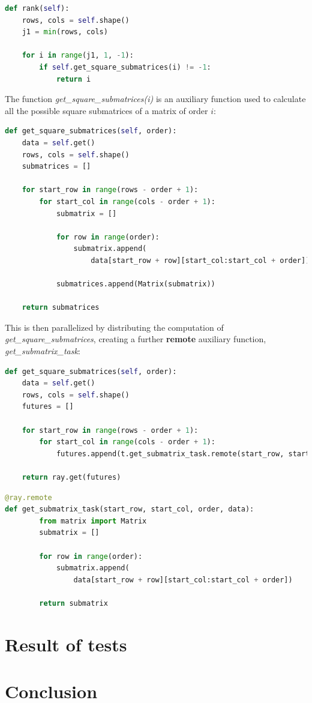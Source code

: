 \begin{lstlisting}[language=Python, caption={Rank function}]
def rank(self):
    rows, cols = self.shape()
    j1 = min(rows, cols)

    for i in range(j1, 1, -1):
        if self.get_square_submatrices(i) != -1:
            return i    
\end{lstlisting}
The function \textit{get\_square\_submatrices(i)} is an auxiliary function used to calculate all the possible square submatrices of a matrix of order $i$:
\begin{lstlisting}[language=Python, caption={get\_square\_submatrices}]
def get_square_submatrices(self, order):
    data = self.get()
    rows, cols = self.shape()
    submatrices = []

    for start_row in range(rows - order + 1):
        for start_col in range(cols - order + 1):
            submatrix = []

            for row in range(order):
                submatrix.append(
                    data[start_row + row][start_col:start_col + order])

            submatrices.append(Matrix(submatrix))

    return submatrices
\end{lstlisting}
This is then parallelized by distributing the computation of \textit{get\_square\_submatrices},  creating a further \textbf{remote} auxiliary function, \textit{get\_submatrix\_task}:
\begin{lstlisting}[language=Python, caption={get\_square\_submatrices}]
def get_square_submatrices(self, order):
    data = self.get()
    rows, cols = self.shape()
    futures = []

    for start_row in range(rows - order + 1):
        for start_col in range(cols - order + 1):            
            futures.append(t.get_submatrix_task.remote(start_row, start_col, order, data))

    return ray.get(futures)
\end{lstlisting}

\begin{lstlisting}[language=Python, caption={get\_submatrix\_task}]
@ray.remote
def get_submatrix_task(start_row, start_col, order, data):
        from matrix import Matrix
        submatrix = []

        for row in range(order):
            submatrix.append(
                data[start_row + row][start_col:start_col + order])
            
        return submatrix
\end{lstlisting}

\pagebreak
\section{Result of tests}


\section{Conclusion}

